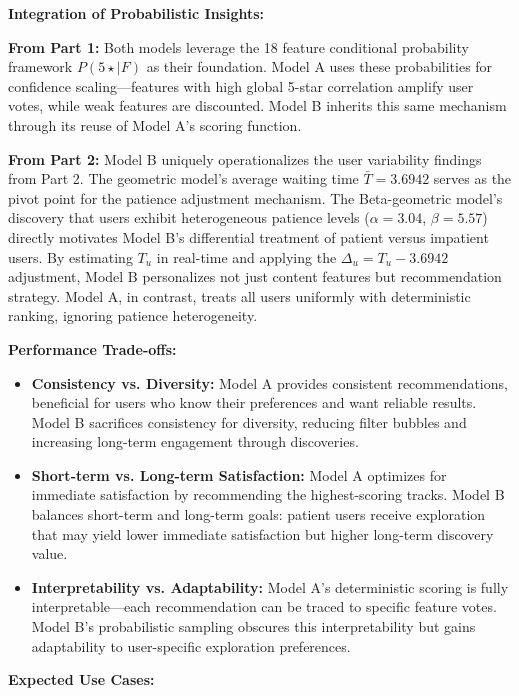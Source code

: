 \documentclass[12pt,a4paper]{article}
\begin{document}
\textbf{Integration of Probabilistic Insights:}

\textbf{From Part 1:} Both models leverage the 18 feature conditional probability framework $P(5\star \mid F)$ as their foundation. Model A uses these probabilities for confidence scaling—features with high global 5-star correlation amplify user votes, while weak features are discounted. Model B inherits this same mechanism through its reuse of Model A's scoring function.

\textbf{From Part 2:} Model B uniquely operationalizes the user variability findings from Part 2. The geometric model's average waiting time $\bar{T} = 3.6942$ serves as the pivot point for the patience adjustment mechanism. The Beta-geometric model's discovery that users exhibit heterogeneous patience levels ($\alpha = 3.04$, $\beta = 5.57$) directly motivates Model B's differential treatment of patient versus impatient users. By estimating $T_u$ in real-time and applying the $\Delta_u = T_u - 3.6942$ adjustment, Model B personalizes not just content features but recommendation strategy. Model A, in contrast, treats all users uniformly with deterministic ranking, ignoring patience heterogeneity.

\textbf{Performance Trade-offs:}

\begin{itemize}
    \item \textbf{Consistency vs. Diversity:} Model A provides consistent recommendations, beneficial for users who know their preferences and want reliable results. Model B sacrifices consistency for diversity, reducing filter bubbles and increasing long-term engagement through discoveries.
    
    \item \textbf{Short-term vs. Long-term Satisfaction:} Model A optimizes for immediate satisfaction by recommending the highest-scoring tracks. Model B balances short-term and long-term goals: patient users receive exploration that may yield lower immediate satisfaction but higher long-term discovery value.
    
    \item \textbf{Interpretability vs. Adaptability:} Model A's deterministic scoring is fully interpretable—each recommendation can be traced to specific feature votes. Model B's probabilistic sampling obscures this interpretability but gains adaptability to user-specific exploration preferences.
\end{itemize}

\textbf{Expected Use Cases:}
\end{document}
